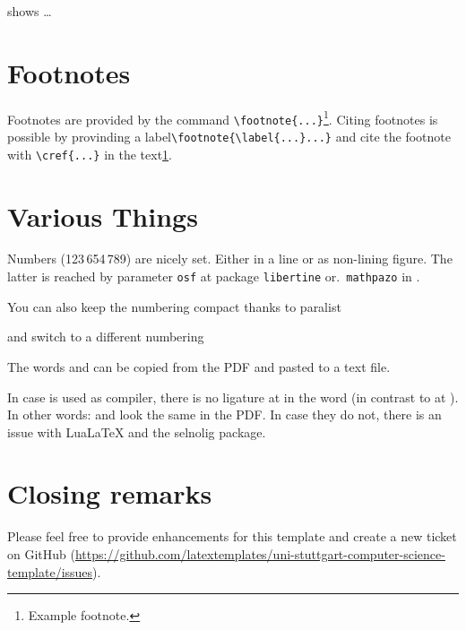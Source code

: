  shows \ldots

\section{Footnotes}
Footnotes are provided by the command \verb+\footnote{...}+\footnote{\label{fussnote}Example footnote.}. Citing footnotes is possible by provinding a label\verb+\footnote{\label{...}...}+ and cite the footnote with \verb+\cref{...}+ in the text\cref{fussnote}.

\section{Various Things}
\label{sec:diff}
\ifdeutsch
  Numbers (123\,654\,789) are nicely set.
  Either in a line or as non-lining figure.
  The latter is reached by parameter \texttt{osf} at package \texttt{libertine} or.\ \texttt{mathpazo} in .
\fi

\begin{filecontents*}{\democodefile}
\begin{compactenum}[I.]
  \item You can also keep the numbering compact thanks to paralist
  \item and switch to a different numbering
\end{compactenum}
\end{filecontents*}

The words  and  can be copied from the PDF and pasted to a text file.

\begin{filecontents*}{\democodefile}
In case \LuaLaTeX{} is used as compiler, there is no ligature at  in the word  (in contrast to  at ).
In other words:  and  look the same in the PDF.
In case they do not, there is an issue with Lua\LaTeX{} and the selnolig package.
\end{filecontents*}


\section{Closing remarks}
Please feel free to provide enhancements for this template and create a new ticket on GitHub (\url{https://github.com/latextemplates/uni-stuttgart-computer-science-template/issues}).
